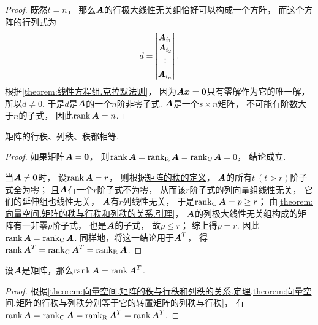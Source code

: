 \begin{lemma}
\begin{proof}
既然\(t=n\)，
那么\(\boldsymbol{A}\)的行极大线性无关组恰好可以构成一个方阵，
而这个方阵的行列式为\begin{equation*}
	d=\begin{vmatrix} \boldsymbol{A}_{i_1} \\ \boldsymbol{A}_{i_2} \\ \vdots \\ \boldsymbol{A}_{i_n} \end{vmatrix}.
\end{equation*}
根据\cref{theorem:线性方程组.克拉默法则}，
因为\(\boldsymbol{A}\boldsymbol{x}=\boldsymbol0\)只有零解作为它的唯一解，
所以\(d\neq0\).
于是\(d\)是\(\boldsymbol{A}\)的一个\(n\)阶非零子式.
\(\boldsymbol{A}\)是一个\(s \times n\)矩阵，
不可能有阶数大于\(n\)的子式，
因此\(\rank\boldsymbol{A} = n\).
\end{proof}
\end{lemma}

\begin{theorem}\label{theorem:向量空间.矩阵的秩与行秩和列秩的关系.定理}
矩阵的行秩、列秩、秩都相等.
\begin{proof}
如果矩阵\(\boldsymbol{A} = \boldsymbol0\)，
则\(\rank\boldsymbol{A}=\rank_{\mathrm{R}}\boldsymbol{A}=\rank_{\mathrm{C}}\boldsymbol{A}=0\)，
结论成立.

当\(\boldsymbol{A}\neq\boldsymbol0\)时，
设\(\rank\boldsymbol{A}=r\)，
则根据\hyperref[definition:线性方程组.矩阵的秩的定义]{矩阵的秩的定义}，
\(\boldsymbol{A}\)的所有\(t\ (t > r)\)阶子式全为零；
且\(\boldsymbol{A}\)有一个\(r\)阶子式不为零，
从而该\(r\)阶子式的列向量组线性无关，
它们的延伸组也线性无关，
\(\boldsymbol{A}\)有\(r\)列线性无关，
于是\(\rank_{\mathrm{C}}\boldsymbol{A}=p \geq r\)；
由\cref{theorem:向量空间.矩阵的秩与行秩和列秩的关系.引理}，
\(\boldsymbol{A}\)的列极大线性无关组构成的矩阵有一非零\(p\)阶子式，
也是\(\boldsymbol{A}\)的子式，
故\(p \leq r\)；
综上得\(p = r\).
因此\(\rank\boldsymbol{A}=\rank_{\mathrm{C}}\boldsymbol{A}\).
同样地，将这一结论用于\(\boldsymbol{A}^T\)，
得\(\rank\boldsymbol{A}^T=\rank_{\mathrm{C}}\boldsymbol{A}^T=\rank_{\mathrm{R}}\boldsymbol{A}\).
\end{proof}
\end{theorem}

\begin{theorem}\label{theorem:向量空间.转置不变秩}
设\(\boldsymbol{A}\)是矩阵，那么\(\rank\boldsymbol{A} = \rank\boldsymbol{A}^T\).
\begin{proof}
根据\cref{theorem:向量空间.矩阵的秩与行秩和列秩的关系.定理,theorem:向量空间.矩阵的行秩与列秩分别等于它的转置矩阵的列秩与行秩}，
有\(\rank\boldsymbol{A}=\rank_{\mathrm{C}}\boldsymbol{A}=\rank_{\mathrm{R}}\boldsymbol{A}^T=\rank\boldsymbol{A}^T\).
\end{proof}
\end{theorem}

